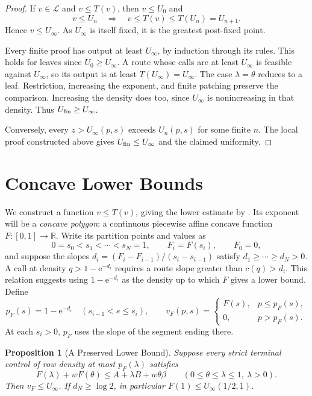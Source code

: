 \documentclass[11pt]{article}
\newtheorem{proposition}[lemma]{Proposition}
\theoremstyle{definition}
\newcommand{\e}{\mathrm e}
\begin{document}
\begin{proof}
If $v\in\mathcal L$ and $v\le T(v)$, then $v\le U_0$ and
\[
 v\le U_n\quad\Longrightarrow\quad
 v\le T(v)\le T(U_n)=U_{n+1}.
\]
Hence $v\le U_\infty$.
As $U_\infty$ is itself fixed, it is the greatest post-fixed point.

Every finite proof has output at least $U_\infty$, by induction through its rules.
This holds for leaves since $U_0\ge U_\infty$.
A route whose calls are at least $U_\infty$ is feasible against $U_\infty$, so its output is at least $T(U_\infty)=U_\infty$.
The case $\lambda=\theta$ reduces to a leaf.
Restriction, increasing the exponent, and finite patching preserve the comparison.
Increasing the density does too, since $U_\infty$ is nonincreasing in that density.
Thus $U_{\rm fin}\ge U_\infty$.

Conversely, every $z>U_\infty(p,s)$ exceeds $U_n(p,s)$ for some finite $n$.
The local proof constructed above gives $U_{\rm fin}\le U_\infty$ and the claimed uniformity.
\end{proof}

\section{Concave Lower Bounds}\label{sec:barrier}
We construct a function $v\le T(v)$, giving the lower estimate by .
Its exponent will be a \emph{concave polygon}: a continuous piecewise affine concave function $F:[0,1]\to\mathbb R$.
Write its partition points and values as
\[
 0=s_0<s_1<\cdots<s_N=1,\qquad F_i=F(s_i),\qquad F_0=0,
\]
and suppose the slopes $d_i=(F_i-F_{i-1})/(s_i-s_{i-1})$ satisfy
$d_1\ge\cdots\ge d_N>0$.
A call at density $q>1-\e^{-d_i}$ requires a route slope greater than $c(q)>d_i$.
This relation suggests using $1-\e^{-d_i}$ as the density up to which $F$ gives a lower bound.
Define
\[
 p_F(s)=1-\e^{-d_i}\quad(s_{i-1}<s\le s_i),\qquad
 v_F(p,s)=\begin{cases}F(s),&p\le p_F(s),\\0,&p>p_F(s).\end{cases}
\]
At each $s_i>0$, $p_F$ uses the slope of the segment ending there.

\begin{proposition}[A Preserved Lower Bound]\label{prop:barrier}
Suppose every strict terminal control of row density at most $p_F(\lambda)$ satisfies
\begin{equation}\label{eq:barrier-terminal}
 F(\lambda)+wF(\theta)
 \le A+\lambda B+w\theta\beta
 \qquad(0\le\theta\le\lambda\le1,\ \lambda>0).
\end{equation}
Then $v_F\le U_\infty$.
If $d_N\ge\log2$, in particular $F(1)\le U_\infty(1/2,1)$.
\end{proposition}
\end{document}
